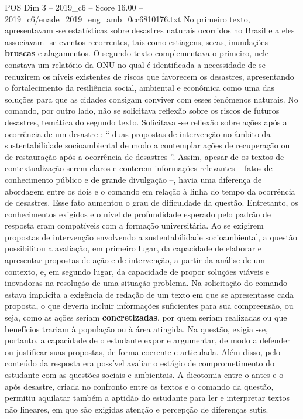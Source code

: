 \begin{textsample}{POS Dim 3 – 2019\_c6 – Score 16.00 – 2019\_c6/enade\_2019\_eng\_amb\_0cc6810176.txt}
No primeiro texto, apresentavam -se estatísticas sobre desastres naturais ocorridos no Brasil e a eles associavam -se eventos recorrentes, tais como estiagens, secas, inundações \textbf{bruscas} e alagamentos.
O segundo texto complementava o primeiro, nele constava um relatório da ONU no qual é identificada a necessidade de se reduzirem os níveis existentes de riscos que favorecem os desastres, apresentando o fortalecimento da resiliência social, ambiental e econômica como uma das soluções para que as cidades consigam conviver com esses fenômenos naturais.
No comando, por outro lado, não se solicitava reflexão sobre os riscos de futuros desastres, temática do segundo texto.
Solicitava -se reflexão sobre ações após a ocorrência de um desastre : “ duas propostas de intervenção no âmbito da sustentabilidade socioambiental de modo a contemplar ações de recuperação ou de restauração após a ocorrência de desastres ”.
Assim, apesar de os textos de contextualização serem claros e conterem informações relevantes – fatos de conhecimento público e de grande divulgação –, havia uma diferença de abordagem entre os dois e o comando em relação à linha do tempo da ocorrência de desastres.
Esse fato aumentou o grau de dificuldade da questão.
Entretanto, os conhecimentos exigidos e o nível de profundidade esperado pelo padrão de resposta eram compatíveis com a formação universitária.
Ao se exigirem propostas de intervenção envolvendo a sustentabilidade socioambiental, a questão possibilitou a avaliação, em primeiro lugar, da capacidade de elaborar e apresentar propostas de ação e de intervenção, a partir da análise de um contexto, e, em segundo lugar, da capacidade de propor soluções viáveis e inovadoras na resolução de uma situação-problema.
Na solicitação do comando estava implícita a exigência de redação de um texto em que se apresentasse cada proposta, o que deveria incluir informações suficientes para sua compreensão, ou seja, como as ações seriam \textbf{concretizadas}, por quem seriam realizadas ou que benefícios trariam à população ou à área atingida.
Na questão, exigia -se, portanto, a capacidade de o estudante expor e argumentar, de modo a defender ou justificar suas propostas, de forma coerente e articulada.
Além disso, pelo conteúdo da resposta era possível avaliar o estágio de comprometimento do estudante com as questões sociais e ambientais.
A dicotomia entre o antes e o após desastre, criada no confronto entre os textos e o comando da questão, permitiu aquilatar também a aptidão do estudante para ler e interpretar textos não lineares, em que são exigidas atenção e percepção de diferenças sutis.

\end{textsample}
